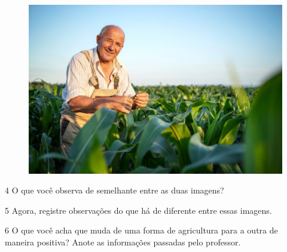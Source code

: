\pagebreak

\begin{figure}[htpb!]
\includegraphics[width=\textwidth]{./imgs/img58.png}
\end{figure}


\num{4} O que você observa de semelhante entre as duas imagens?


\num{5} Agora, registre observações do que há de diferente entre essas imagens.


\pagebreak

\num{6} O que você acha que muda de uma forma de agricultura para a outra de
maneira positiva? Anote as informações passadas pelo professor. 


